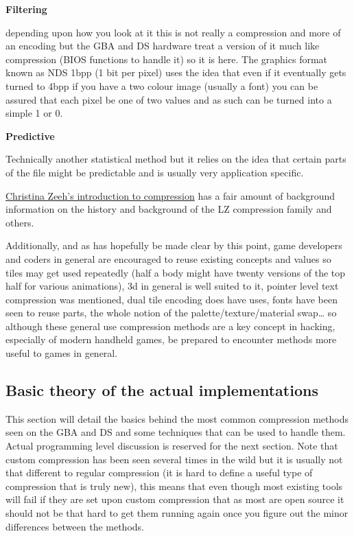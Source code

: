 \documentclass[
]{book}
\begin{document}
\textbf{Filtering}

depending upon how you look at it this is not really a compression and more of an encoding but the GBA and DS hardware treat a version of it much like compression (BIOS functions to handle it) so it is here. The graphics format known as NDS 1bpp (1 bit per pixel) uses the idea that even if it eventually gets turned to 4bpp if you have a two colour image (usually a font) you can be assured that each pixel be one of two values and as such can be turned into a simple 1 or 0.

\textbf{Predictive}

Technically another statistical method but it relies on the idea that certain parts of the file might be predictable and is usually very application specific.

\href{https://ece.uwaterloo.ca/~ece611/LempelZiv.pdf}{Christina Zeeh's introduction to compression} has a fair amount of background information on the history and background of the LZ compression family and others.

Additionally, and as has hopefully be made clear by this point, game developers and coders in general are encouraged to reuse existing concepts and values so tiles may get used repeatedly (half a body might have twenty versions of the top half for various animations), 3d in general is well suited to it, pointer level text compression was mentioned, dual tile encoding does have uses, fonts have been seen to reuse parts, the whole notion of the palette/texture/material swap\ldots{} so although these general use compression methods are a key concept in hacking, especially of modern handheld games, be prepared to encounter methods more useful to games in general.

\hypertarget{basic-theory-of-the-actual-implementations}{%
\subsection{Basic theory of the actual implementations}\label{basic-theory-of-the-actual-implementations}}

This section will detail the basics behind the most common compression methods seen on the GBA and DS and some techniques that can be used to handle them. Actual programming level discussion is reserved for the next section. Note that custom compression has been seen several times in the wild but it is usually not that different to regular compression (it is hard to define a useful type of compression that is truly new), this means that even though most existing tools will fail if they are set upon custom compression that as most are open source it should not be that hard to get them running again once you figure out the minor differences between the methods.
\end{document}
